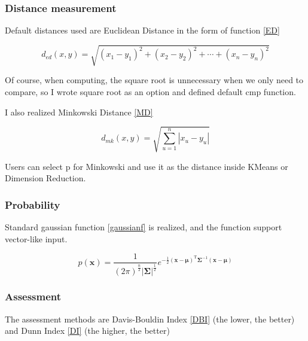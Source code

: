 \documentclass[conference]{IEEEtran}
\begin{document}
\subsubsection{Distance measurement}
Default distances used are Euclidean Distance in the form of function \ref{ED}

\small
\begin{equation}
	d_{ed}(x, y)=\sqrt{\left(x_{1}-y_{1}\right)^{2}+\left(x_{2}-y_{2}\right)^{2}+\cdots+\left(x_{n}-y_{n}\right)^{2}}
	\label{ED}
\end{equation}
\normalsize

Of course, when computing, the square root is unnecessary when we only need to compare, so I wrote square root as an option and defined default cmp function.

I also realized Minkowski Distance \ref{MD}

\begin{equation}
	d_{mk}(x, y)=\sqrt{\sum_{u=1}^{n}{\left|x_u-y_u\right|}}
		\label{MD}
\end{equation}

Users can select p for Minkowski and use it as the distance inside KMeans or Dimension Reduction.

\subsubsection{\textbf{Probability}}
Standard gaussian function \ref{gaussianf} is realized, and the function support vector-like input.

\begin{equation}
	p(\boldsymbol{x})=\frac{1}{(2 \pi)^{\frac{n}{2}}|\boldsymbol{\Sigma}|^{\frac{1}{2}}} e^{-\frac{1}{2}(\boldsymbol{x}-\boldsymbol{\mu})^{\mathrm{T}} \boldsymbol{\Sigma}^{-1}(\boldsymbol{x}-\boldsymbol{\mu})}
	\label{gaussianf}
\end{equation}

\subsubsection{\textbf{Assessment}}
The assessment methods are Davis-Bouldin Index \ref{DBI} (the lower, the better) and Dunn Index \ref{DI} (the higher, the better)
\end{document}
